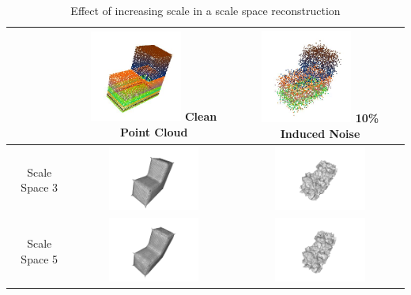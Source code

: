 \documentclass[12pt]{drexelthesis}
\begin{document}
\begin{table}
\begin{centering}
\caption[Effect of increasing scale in a scale space reconstruction]{Effect of increasing scale in a scale space reconstruction}
\begin{tabular}{ | c | c | c | }
\hline
& \includegraphics[width=3cm]{l_block_pt_cloud.jpg}
	Clean Point Cloud
& \includegraphics[width=3cm]{l_block_pt_cloud10pnoise.jpg}
	10\% Induced Noise
\\
\hline
Scale Space 3 & \includegraphics[width=3cm]{scalespace/clean/scalespace3.png} & \includegraphics[width=3cm]{scalespace/10pnoise/scale3.png}
\\
\hline
Scale Space 5 & \includegraphics[width=3cm]{scalespace/clean/scalespace5.png} & \includegraphics[width=3cm]{scalespace/10pnoise/scale5.png}
\\

\end{tabular}
\end{centering}
\end{table}
\end{document}
